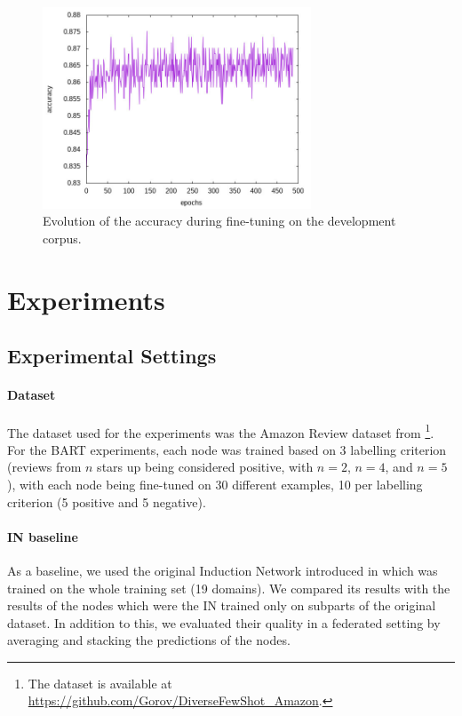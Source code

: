 \documentclass{esannV2}
\begin{document}
        \begin{figure}[h!]
        \begin{center}
        \includegraphics[width=8cm]{pics/dev.jpg}
        \caption[]{Evolution of the accuracy during fine-tuning on the development corpus.}
        \label{fig:dev}
        \end{center}
        \end{figure}



        
    \section{Experiments}
        
        \subsection{Experimental Settings}
        \paragraph{Dataset} The dataset used for the experiments was the Amazon Review dataset from \cite{yu2018diverse}\footnote{The dataset is available at \url{https://github.com/Gorov/DiverseFewShot_Amazon}.}.
        For the BART experiments, each node was trained based on 3 labelling criterion (reviews from $n$ stars up being considered positive, with $n = 2$, $n = 4$, and $n = 5$), with each node being fine-tuned on 30 different examples, 10 per labelling criterion (5 positive and 5 negative).
        
        \paragraph{IN baseline} As a baseline, we used the original Induction Network introduced in \cite{geng2019induction} which was trained on the whole training set (19 domains). We compared its results with the results of the nodes which were the IN trained only on subparts of the original dataset. In addition to this, we evaluated their quality in a federated setting by averaging and stacking the predictions of the nodes.
        
\end{document}
